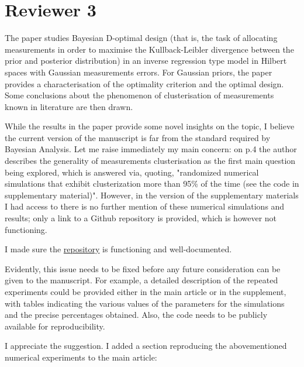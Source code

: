 \section{Reviewer 3}
\RC The paper studies Bayesian D-optimal design (that is, the task of
allocating measurements in order to maximise the Kullback-Leibler
divergence between the prior and posterior distribution) in an inverse
regression type model in Hilbert spaces with Gaussian measurements
errors. For Gaussian priors, the paper provides a characterisation of
the optimality criterion and the optimal design. Some conclusions
about the phenomenon of clusterisation of measurements known in
literature are then drawn.


\RC While the results in the paper provide some novel insights on the
topic, I believe the current version of the manuscript is far from the
standard required by Bayesian Analysis. Let me raise immediately my
main concern: on p.4 the author describes the generality of
measurements clusterisation as the first main question being explored,
which is answered via, quoting, "randomized numerical simulations that
exhibit clusterization more than 95\% of the time (see the code in
supplementary material)". However, in the version of the supplementary
materials I had access to there is no further mention of these
numerical simulations and results; only a link to a Github repository
is provided, which is however not functioning.

\AR I made sure the \href{https://github.com/yairdaon/OED}{repository}
is functioning and well-documented.


\RC Evidently, this issue needs to be fixed before any future
consideration can be given to the manuscript. For example, a detailed
description of the repeated experiments could be provided either in
the main article or in the supplement, with tables indicating the
various values of the parameters for the simulations and the precise
percentages obtained. Also, the code needs to be publicly available
for reproducibility.

\AR I appreciate the suggestion. I added a section reproducing the
abovementioned numerical experiments to the main article:



